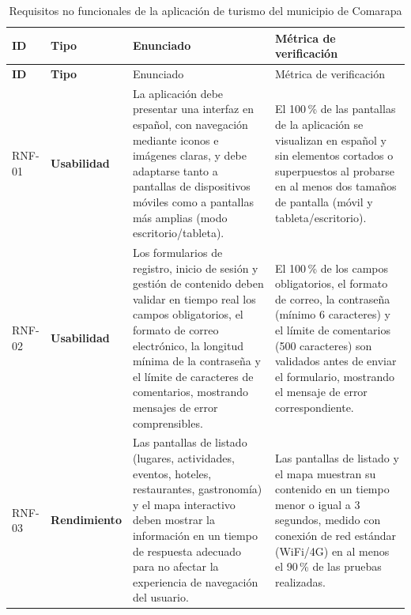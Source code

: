 
\begin{longtable}{|>{\bfseries}p{1.2cm}|>{\bfseries}p{2.3cm}|p{4.8cm}|p{4.8cm}|}
\caption{Requisitos no funcionales de la aplicación de turismo del municipio de Comarapa}
\label{tab:rnf} \\
\hline
ID & Tipo & Enunciado & Métrica de verificación \\ \hline
\endfirsthead

\hline
ID & Tipo & Enunciado & Métrica de verificación \\ \hline
\endhead

\hline
\endfoot

\hline
\endlastfoot

RNF-01 & Usabilidad & La aplicación debe presentar una interfaz en español, con navegación mediante iconos e imágenes claras, y debe adaptarse tanto a pantallas de dispositivos móviles como a pantallas más amplias (modo escritorio/tableta). & El 100\,\% de las pantallas de la aplicación se visualizan en español y sin elementos cortados o superpuestos al probarse en al menos dos tamaños de pantalla (móvil y tableta/escritorio). \\ \hline

RNF-02 & Usabilidad & Los formularios de registro, inicio de sesión y gestión de contenido deben validar en tiempo real los campos obligatorios, el formato de correo electrónico, la longitud mínima de la contraseña y el límite de caracteres de comentarios, mostrando mensajes de error comprensibles. & El 100\,\% de los campos obligatorios, el formato de correo, la contraseña (mínimo 6 caracteres) y el límite de comentarios (500 caracteres) son validados antes de enviar el formulario, mostrando el mensaje de error correspondiente. \\ \hline

RNF-03 & Rendimiento & Las pantallas de listado (lugares, actividades, eventos, hoteles, restaurantes, gastronomía) y el mapa interactivo deben mostrar la información en un tiempo de respuesta adecuado para no afectar la experiencia de navegación del usuario. & Las pantallas de listado y el mapa muestran su contenido en un tiempo menor o igual a 3 segundos, medido con conexión de red estándar (WiFi/4G) en al menos el 90\,\% de las pruebas realizadas. \\ \hline


\end{longtable}
